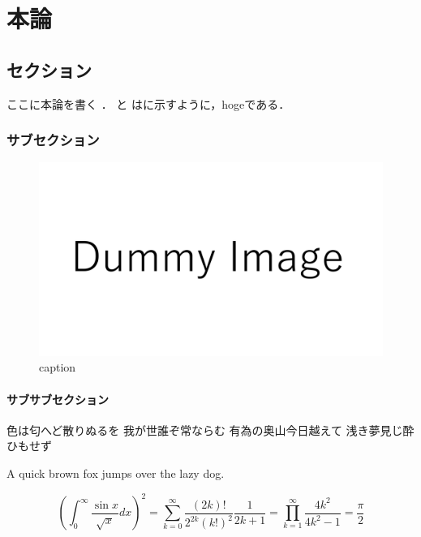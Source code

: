 \documentclass[main]{subfiles}
\begin{document}
\chapter{本論}
\section{セクション}
ここに本論を書く \cite{ref:yao2017integrated} \cite{ref:ugarte1992curling} \cite{ref:nomura2022uwb}．
と はに示すように，hogeである．

\subsection{サブセクション}

\begin{figure}[htbp]
    \centering
    \includegraphics[keepaspectratio, width=\linewidth]{figures/dummy.pdf}
    \caption{caption}
    \label{fig:label}
\end{figure}

\subsubsection{サブサブセクション}

色は匂へど散りぬるを 我が世誰ぞ常ならむ 有為の奥山今日越えて 浅き夢見じ酔ひもせず


A quick brown fox jumps over the lazy dog.


\begin{equation}
    \left( \int_{0}^\infty \frac{\sin x}{\sqrt {x}} dx \right)^{2}
    = \sum_{k = 0}^\infty \frac{(2k)!}{2^{2k}(k!)^{2}} \frac{1}{2k + 1}
    = \prod_{k = 1}^\infty \frac{4k^{2}}{4k^{2} - 1} = \frac{\pi}{2}
    \label{eq:label}
\end{equation}
\end{document}
